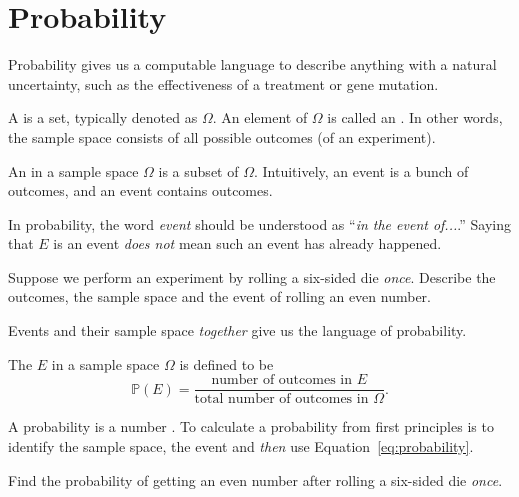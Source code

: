 \documentclass[../main.tex]{subfiles}
\begin{document}
 \section{Probability}

Probability gives us a computable language to describe anything with a natural uncertainty, such as the effectiveness of a treatment or gene mutation.

\begin{definition} \label{def:probability}
  A  is a set, typically denoted as \(\Omega\).  An element of \(\Omega\) is called an .   In other words, the sample space consists of all possible outcomes (of an experiment).

  An  in a sample space \(\Omega\) is a subset of \(\Omega\).  Intuitively,  an event is a bunch of outcomes, and an event contains outcomes. 
\end{definition}
In probability, the word \emph{event} should be understood as ``\emph{in the event of...}.'' Saying that \(E\) is an event \emph{does not} mean such an event has already happened.


\begin{example} \label{ex:probability-die-1}
  Suppose we perform an experiment by rolling a six-sided die \emph{once}.  Describe the outcomes, the sample space and the event of rolling an even number. 

\end{example}

Events and their sample space \emph{together} give us the language of probability.
\begin{definition}[probability] \label{def:probability-formula}
  The  \(E\) in a sample space \(\Omega\) is defined to be
  \begin{equation} \label{eq:probability}
    \mathbb{P}(E) = \frac{\text{number of outcomes in \(E\)}}{\text{total number of outcomes in \(\Omega\)}}.
  \end{equation}
\end{definition}
A probability is a number \underline{\hspace{3in}}. To calculate a probability from first principles  is to identify the sample space, the event and \emph{then} use Equation~\eqref{eq:probability}.
\begin{example} \label{ex:probability-even-die}
  Find the probability of getting an even number after rolling a six-sided die \emph{once}.

  \blanks*
\end{example}
\clearpage
\end{document}
